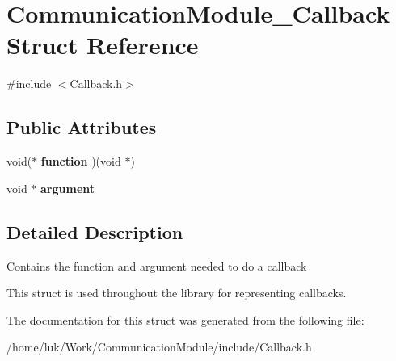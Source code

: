 \hypertarget{structCommunicationModule__Callback}{}\section{Communication\+Module\+\_\+\+Callback Struct Reference}
\label{structCommunicationModule__Callback}


{\ttfamily \#include $<$Callback.\+h$>$}

\subsection*{Public Attributes}
\begin{DoxyCompactItemize}
\item 
\mbox{\label{structCommunicationModule__Callback_a578ee8430667f5a8548558405999264b}} 
void($\ast$ {\bfseries function} )(void $\ast$)
\item 
\mbox{\label{structCommunicationModule__Callback_a4d7f7f13f73908f7fd747a19e9caa552}} 
void $\ast$ {\bfseries argument}
\end{DoxyCompactItemize}


\subsection{Detailed Description}
Contains the function and argument needed to do a callback

This struct is used throughout the library for representing callbacks. 

The documentation for this struct was generated from the following file\+:\begin{DoxyCompactItemize}
\item 
/home/luk/\+Work/\+Communication\+Module/include/Callback.\+h\end{DoxyCompactItemize}
